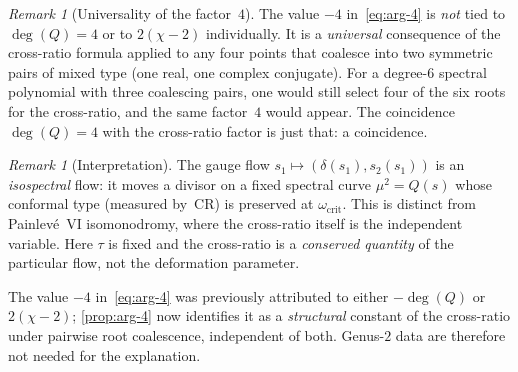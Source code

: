 \documentclass[11pt,a4paper]{article}
\theoremstyle{plain}
\theoremstyle{definition}
\theoremstyle{remark}
\newtheorem{remark}[theorem]{Remark}
\begin{document}
\begin{remark}[Universality of the factor~$4$]
The value $-4$ in~\eqref{eq:arg-4} is
\emph{not} tied to $\deg(Q) = 4$ or to $2(\chi - 2)$
individually.  It is a \emph{universal} consequence of the
cross-ratio formula applied to any four points that coalesce
into two symmetric pairs of mixed type (one real, one complex
conjugate).  For a degree-$6$ spectral polynomial with three
coalescing pairs, one would still select four of the six roots
for the cross-ratio, and the same factor~$4$ would appear.
The coincidence $\deg(Q) = 4$ with the cross-ratio factor is just
that: a coincidence.
\end{remark}

\begin{remark}[Interpretation]
\label{rem:isospectral}
The gauge flow $s_1 \mapsto (\delta(s_1), s_2(s_1))$ is an
\emph{isospectral} flow: it moves a divisor on a fixed spectral
curve $\mu^2 = Q(s)$ whose conformal type (measured by~$\mathrm{CR}$)
is preserved at $\omega_{\mathrm{crit}}$.
This is distinct from Painlev\'e~VI isomonodromy, where the
cross-ratio itself is the independent variable.  Here $\tau$ is
fixed and the cross-ratio is a \emph{conserved quantity} of the
particular flow, not the deformation parameter.

The value $-4$ in~\eqref{eq:arg-4} was previously attributed to
either $-\deg(Q)$ or $2(\chi - 2)$;
\cref{prop:arg-4} now identifies it as a \emph{structural}
constant of the cross-ratio under pairwise root coalescence,
independent of both.  Genus-$2$ data are therefore not needed
for the explanation.
\end{remark}
\end{document}
